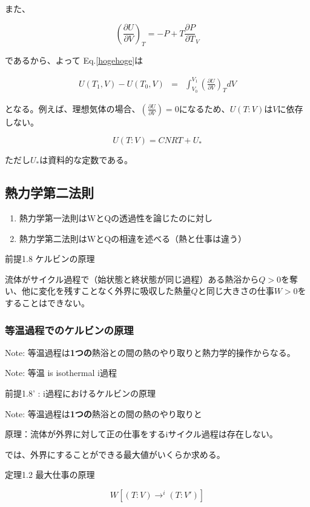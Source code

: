 また、

\begin{equation}
  \left(\frac{\partial U}{\partial V}\right)_T = -P + T \frac{\partial P}{\partial T}_V
\end{equation}

であるから、よって Eq.\ref{hogehoge}は

\begin{eqnarray}
  U(T_1, V) - U(T_0, V) 
     &=& \int_{V_0}^{V_1} \left(\frac{\partial U}{\partial V}\right)_T dV
  \label{hogehoge}
\end{eqnarray}

となる。例えば、理想気体の場合、$\left(\frac{\partial U}{\partial V}\right) = 0$になるため、$U(T:V)$は$V$に依存しない。

\begin{equation}
  U(T:V) = CNRT + U_*
\end{equation}

ただし$U_*$は資料的な定数である。

\subsection*{熱力学第二法則}

\begin{enumerate}
  \item 熱力学第一法則はWとQの透過性を論じたのに対し
  \item 熱力学第二法則はWとQの相違を述べる（熱と仕事は違う）
\end{enumerate}

前提1.8 ケルビンの原理

流体がサイクル過程で（始状態と終状態が同じ過程）ある熱浴から$Q>0$を奪い、他に変化を残すことなく外界に吸収した熱量$Q$と同じ大きさの仕事$W>0$をすることはできない。

\subsubsection{等温過程でのケルビンの原理}

Note: 等温過程は\textbf{1つの}熱浴との間の熱のやり取りと熱力学的操作からなる。

Note: 等温 is isothermal \rightarrow i過程

前提1.8' : i過程におけるケルビンの原理

Note: 等温過程は\textbf{1つの}熱浴との間の熱のやり取りと

原理：流体が外界に対して正の仕事をするiサイクル過程は存在しない。

では、外界にすることができる最大値がいくらか求める。

定理1.2 最大仕事の原理

\begin{equation}
  W[(T:V) \rightarrow^i (T:V')] 
\end{equation}

